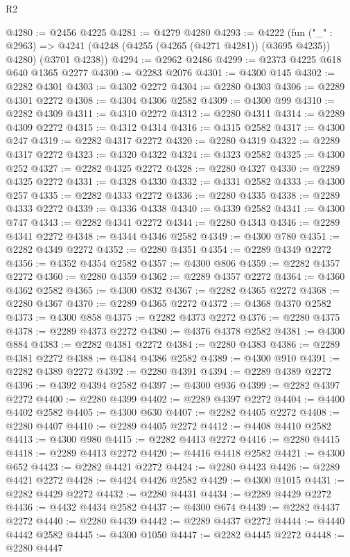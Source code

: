 \begin{lexlean}{R2}
\begin{coremodule}
@4280 := @2456 @4225
@4281 := @4279 @4280
@4293 := @4222
    (fun ("_" : @2963) =>
    @4241 (@4248 (@4255 (@4265 (@4271 @4281)) (@3695 @4235)) @4280) (@3701 @4238))
@4294 := @2962 @2486
@4299 := @2373 @4225 @618 @640 @1365 @2277
@4300 := @2283 @2076
@4301 := @4300 @145
@4302 := @2282 @4301
@4303 := @4302 @2272
@4304 := @2280 @4303
@4306 := @2289 @4301 @2272
@4308 := @4304 @4306 @2582
@4309 := @4300 @99
@4310 := @2282 @4309
@4311 := @4310 @2272
@4312 := @2280 @4311
@4314 := @2289 @4309 @2272
@4315 := @4312 @4314
@4316 := @4315 @2582
@4317 := @4300 @247
@4319 := @2282 @4317 @2272
@4320 := @2280 @4319
@4322 := @2289 @4317 @2272
@4323 := @4320 @4322
@4324 := @4323 @2582
@4325 := @4300 @252
@4327 := @2282 @4325 @2272
@4328 := @2280 @4327
@4330 := @2289 @4325 @2272
@4331 := @4328 @4330
@4332 := @4331 @2582
@4333 := @4300 @257
@4335 := @2282 @4333 @2272
@4336 := @2280 @4335
@4338 := @2289 @4333 @2272
@4339 := @4336 @4338
@4340 := @4339 @2582
@4341 := @4300 @747
@4343 := @2282 @4341 @2272
@4344 := @2280 @4343
@4346 := @2289 @4341 @2272
@4348 := @4344 @4346 @2582
@4349 := @4300 @780
@4351 := @2282 @4349 @2272
@4352 := @2280 @4351
@4354 := @2289 @4349 @2272
@4356 := @4352 @4354 @2582
@4357 := @4300 @806
@4359 := @2282 @4357 @2272
@4360 := @2280 @4359
@4362 := @2289 @4357 @2272
@4364 := @4360 @4362 @2582
@4365 := @4300 @832
@4367 := @2282 @4365 @2272
@4368 := @2280 @4367
@4370 := @2289 @4365 @2272
@4372 := @4368 @4370 @2582
@4373 := @4300 @858
@4375 := @2282 @4373 @2272
@4376 := @2280 @4375
@4378 := @2289 @4373 @2272
@4380 := @4376 @4378 @2582
@4381 := @4300 @884
@4383 := @2282 @4381 @2272
@4384 := @2280 @4383
@4386 := @2289 @4381 @2272
@4388 := @4384 @4386 @2582
@4389 := @4300 @910
@4391 := @2282 @4389 @2272
@4392 := @2280 @4391
@4394 := @2289 @4389 @2272
@4396 := @4392 @4394 @2582
@4397 := @4300 @936
@4399 := @2282 @4397 @2272
@4400 := @2280 @4399
@4402 := @2289 @4397 @2272
@4404 := @4400 @4402 @2582
@4405 := @4300 @630
@4407 := @2282 @4405 @2272
@4408 := @2280 @4407
@4410 := @2289 @4405 @2272
@4412 := @4408 @4410 @2582
@4413 := @4300 @980
@4415 := @2282 @4413 @2272
@4416 := @2280 @4415
@4418 := @2289 @4413 @2272
@4420 := @4416 @4418 @2582
@4421 := @4300 @652
@4423 := @2282 @4421 @2272
@4424 := @2280 @4423
@4426 := @2289 @4421 @2272
@4428 := @4424 @4426 @2582
@4429 := @4300 @1015
@4431 := @2282 @4429 @2272
@4432 := @2280 @4431
@4434 := @2289 @4429 @2272
@4436 := @4432 @4434 @2582
@4437 := @4300 @674
@4439 := @2282 @4437 @2272
@4440 := @2280 @4439
@4442 := @2289 @4437 @2272
@4444 := @4440 @4442 @2582
@4445 := @4300 @1050
@4447 := @2282 @4445 @2272
@4448 := @2280 @4447

\end{coremodule}
\end{lexlean}
